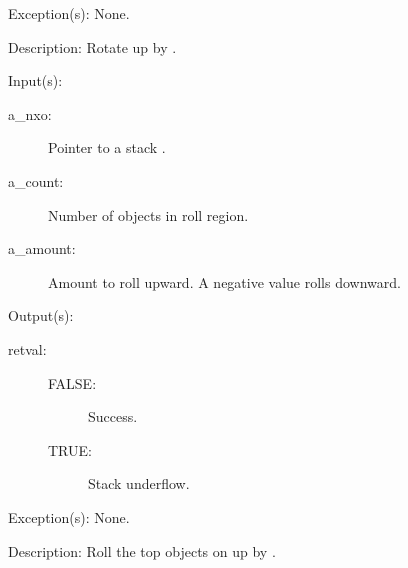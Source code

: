 \begin{capi}
\begin{capilist}
	\item[Exception(s): ] None.
	\item[Description: ]
		Rotate  up by .
	\end{capilist}
\label{nxo_stack_roll}
	\begin{capilist}
	\item[Input(s): ]
		\begin{description}\item[]
		\item[a\_nxo: ]
			Pointer to a stack .
		\item[a\_count: ]
			Number of objects in roll region.
		\item[a\_amount: ]
			Amount to roll upward.  A negative value rolls downward.
		\end{description}
	\item[Output(s): ]
		\begin{description}\item[]
		\item[retval: ]
			\begin{description}\item[]
			\item[FALSE: ]
				Success.
			\item[TRUE: ]
				Stack underflow.
			\end{description}
		\end{description}
	\item[Exception(s): ] None.
	\item[Description: ]
		Roll the top  objects on  up by
		.
	\end{capilist}
\end{capi}

